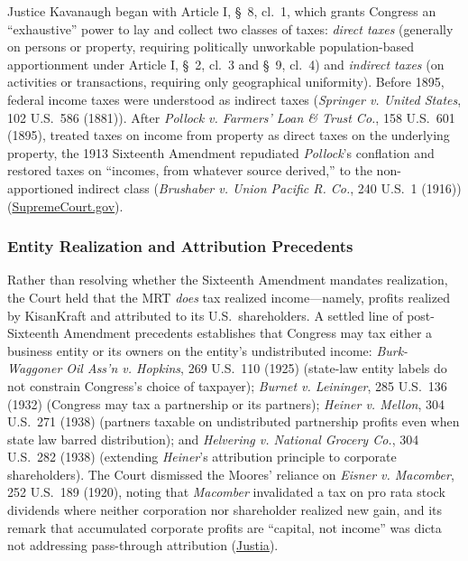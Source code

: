 \documentclass[12pt]{article}
\begin{document}
Justice Kavanaugh began with Article I, \S\ 8, cl.\ 1, which grants Congress an ``exhaustive'' power to lay and collect two classes of taxes: \textit{direct taxes} (generally on persons or property, requiring politically unworkable population-based apportionment under Article I, \S\ 2, cl.\ 3 and \S\ 9, cl.\ 4) and \textit{indirect taxes} (on activities or transactions, requiring only geographical uniformity). Before 1895, federal income taxes were understood as indirect taxes (\textit{Springer v. United States}, 102 U.S.\ 586 (1881)). After \textit{Pollock v. Farmers' Loan \& Trust Co.}, 158 U.S.\ 601 (1895), treated taxes on income from property as direct taxes on the underlying property, the 1913 Sixteenth Amendment repudiated \textit{Pollock}'s conflation and restored taxes on ``incomes, from whatever source derived,'' to the non-apportioned indirect class (\textit{Brushaber v. Union Pacific R. Co.}, 240 U.S.\ 1 (1916)) (\href{https://www.supremecourt.gov/opinions/23pdf/602us1r41_h3dj.pdf}{SupremeCourt.gov}).

\subsubsection{Entity Realization and Attribution Precedents}

Rather than resolving whether the Sixteenth Amendment mandates realization, the Court held that the MRT \textit{does} tax realized income---namely, profits realized by KisanKraft and attributed to its U.S.\ shareholders. A settled line of post-Sixteenth Amendment precedents establishes that Congress may tax either a business entity or its owners on the entity's undistributed income: \textit{Burk-Waggoner Oil Ass'n v. Hopkins}, 269 U.S.\ 110 (1925) (state-law entity labels do not constrain Congress's choice of taxpayer); \textit{Burnet v. Leininger}, 285 U.S.\ 136 (1932) (Congress may tax a partnership or its partners); \textit{Heiner v. Mellon}, 304 U.S.\ 271 (1938) (partners taxable on undistributed partnership profits even when state law barred distribution); and \textit{Helvering v. National Grocery Co.}, 304 U.S.\ 282 (1938) (extending \textit{Heiner}'s attribution principle to corporate shareholders). The Court dismissed the Moores' reliance on \textit{Eisner v. Macomber}, 252 U.S.\ 189 (1920), noting that \textit{Macomber} invalidated a tax on pro rata stock dividends where neither corporation nor shareholder realized new gain, and its remark that accumulated corporate profits are ``capital, not income'' was dicta not addressing pass-through attribution (\href{https://supreme.justia.com/cases/federal/us/602/22-800/}{Justia}).
\end{document}

